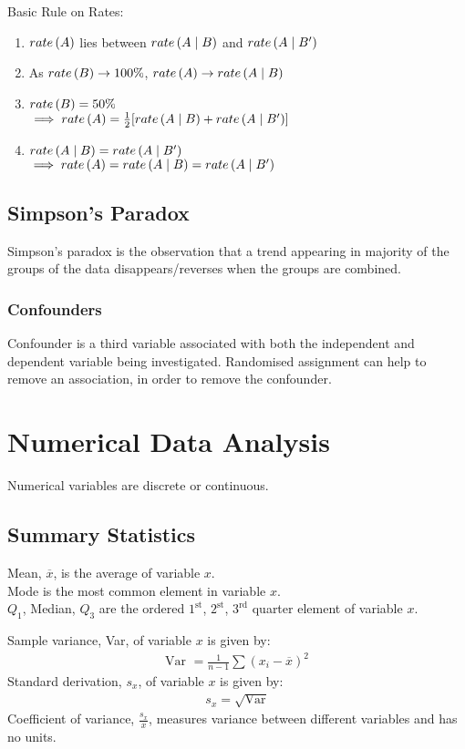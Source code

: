 \documentclass[12pt, a4paper]{article}
\begin{document}
\begin{multicols*}{3}
Basic Rule on Rates:
\begin{enumerate}[\roman*.]
  \item $\mathord{rate} \left( A \right)$ lies between $\mathord{rate} \left( A\mid B \right)$ and $\mathord{rate} \left( A\mid B' \right)$
  \item As $\mathord{rate} \left( B \right) \rightarrow 100\%$, $\mathord{rate} \left( A \right) \rightarrow \mathord{rate} \left( A\mid B \right)$
  \item $\mathord{rate} \left( B \right) = 50\%$ \\$\implies \mathord{rate} \left( A \right) = \frac{1}{2}[\mathord{rate} \left( A\mid B \right) + \mathord{rate} \left( A\mid B' \right)]$
  \item $\mathord{rate} \left( A\mid B \right) = \mathord{rate} \left( A\mid B' \right)$\\$\implies \mathord{rate} \left( A \right) = \mathord{rate} \left( A\mid B \right) = \mathord{rate} \left( A\mid B' \right)$
\end{enumerate}

\subsection{Simpson's Paradox}
Simpson's paradox is the observation that a trend appearing in majority of the groups of the data disappears/reverses when the groups are combined.

\subsubsection{Confounders}
Confounder is a third variable associated with both the independent and dependent variable being investigated. Randomised assignment can help to remove an association, in order to remove the confounder.

\section{Numerical Data Analysis}
Numerical variables are discrete or continuous.

\subsection{Summary Statistics}
Mean, $\overline{x}$, is the average of variable $x$.\\
Mode is the most common element in variable $x$.\\
$Q_1$, Median, $Q_3$ are the ordered  $1^{\text{st}}$, $2^{\text{st}}$, $3^{\text{rd}}$ quarter element of variable $x$.

Sample variance, Var, of variable $x$ is given by: 
\begin{align*}
  \text{Var }= \frac{1}{n-1}\sum (x_i-\overline{x})^2
\end{align*}
Standard derivation, $s_x$, of variable $x$ is given by:
\begin{align*}
  s_x = \sqrt{\text{Var}}
\end{align*}
Coefficient of variance, $\displaystyle \frac{s_x}{x}$, measures variance between different variables and has no units.


\end{multicols*}
\end{document}
